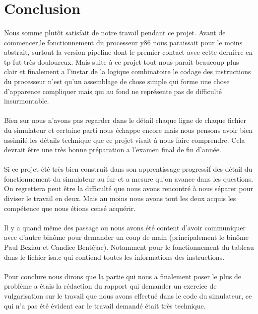 \documentclass[12pt]{article}
\begin{document}
\newpage

\section{Conclusion}

\paragraph{} Nous somme plutôt satisfait de notre travail pendant ce projet. Avant de commencer,le fonctionnement du processeur y86 nous paraissait pour le moins abstrait, surtout la version pipeline dont le premier contact avec cette dernière en tp fut très douloureux. Mais suite à ce projet tout nous parait beaucoup plus clair et finalement a l'instar de la logique combinatoire le codage des instructions du processeur n'est qu'un assemblage de chose simple qui forme une chose d'apparence compliquer mais qui au fond ne représente pas de difficulté insurmontable.

\paragraph{} Bien sur nous n'avons pas regarder dans le détail chaque ligne de chaque fichier du simulateur et certaine parti nous échappe encore mais nous pensons avoir bien assimilé les détails technique que ce projet visait à nous faire comprendre. Cela devrait être une très bonne préparation a l’examen final de fin d'année.

\paragraph{} Si ce projet été très bien construit dans son apprentissage progressif des détail du fonctionnement du simulateur au fur et a mesure qu'on avance dans les questions. On regrettera peut être la difficulté que nous avons rencontré à nous séparer pour diviser le travail en deux. Mais au moins nous avons tout les deux acquis les compétence que nous étions censé acquérir.

\paragraph{} Il y a quand même des passage ou nous avons été content d'avoir communiquer avec d'autre binôme pour demander un coup de main (principalement le binôme Paul Beziau et Candice Bentéjac). Notamment pour le fonctionnement du tableau dans le fichier isa.c qui contiend toutes les informations des instructions.

\paragraph{} Pour conclure nous dirons que la partie qui nous a finalement poser le plus de problème a étais la rédaction du rapport qui demander un exercice de vulgarisation sur le travail que nous avons effectué dans le code du simulateur, ce qui n'a pas été évident car le travail demandé était très technique.
\end{document}
